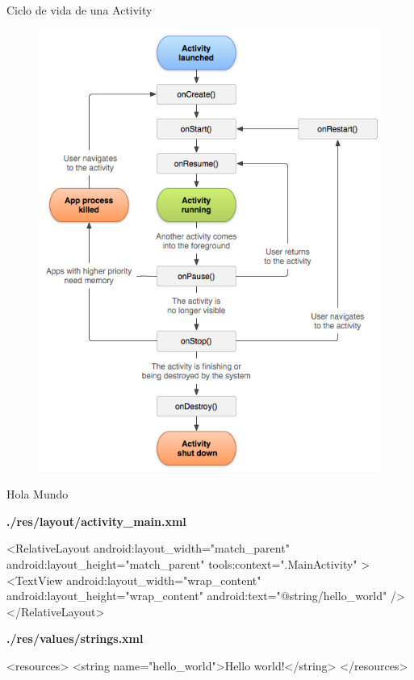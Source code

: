 \begin{frame}{Ciclo de vida de una Activity}
\begin{block}{}
\begin{figure}[H]
\centering
\includegraphics[scale=.33]{./img/activityLifecycle.png}
\end{figure}
\end{block}
\end{frame}

\begin{frame}[fragile]{Hola Mundo}
\begin{block}{}
\textbf{./res/layout/activity\_main.xml}
\begin{xmlcode}
<RelativeLayout
    android:layout_width="match_parent"
    android:layout_height="match_parent"
    tools:context=".MainActivity" >
    <TextView
        android:layout_width="wrap_content"
        android:layout_height="wrap_content"
        android:text="@string/hello_world" />
</RelativeLayout>
\end{xmlcode}
\textbf{./res/values/strings.xml}
\begin{xmlcode}
<resources>
    <string name="hello_world">Hello world!</string>
</resources>
\end{xmlcode}
\end{block}
\end{frame}
